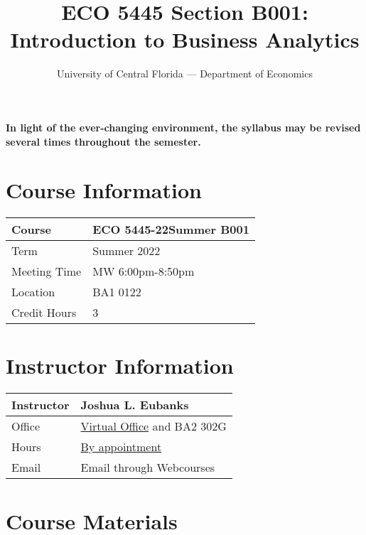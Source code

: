 \documentclass[11pt]{paper}
\begin{document}
\title{ECO 5445 Section B001: Introduction to Business Analytics}
\author{University of Central Florida --- Department of Economics}

\maketitle
\hrulefill

\begin{flushleft}
{\color{red} \textbf{In light of the ever-changing environment, the syllabus may be revised several times throughout the semester.}}
\end{flushleft}

\section*{Course Information}
\begin{flushleft}
\begin{tabular}{| l | l |}\hline
 Course & ECO 5445-22Summer B001 \\\hline
 Term & Summer 2022 \\\hline
 Meeting Time & MW 6:00pm-8:50pm\\\hline
 Location & BA1 0122\\\hline
 Credit Hours & 3 \\\hline
\end{tabular}
\end{flushleft}

\section*{Instructor Information}
\begin{flushleft}
\begin{tabular}{| l | l |}\hline
 Instructor & Joshua L. Eubanks \\\hline
 Office & \href{https://ucf.zoom.us/j/2438809427}{Virtual Office} and BA2 302G \\\hline
 Hours & \href{https://calendly.com/ucf-office-hours-jeubanks}{By appointment} \\\hline
 Email & Email through Webcourses \\\hline
\end{tabular}
\end{flushleft}


\section*{Course Materials}
 
\end{document}
